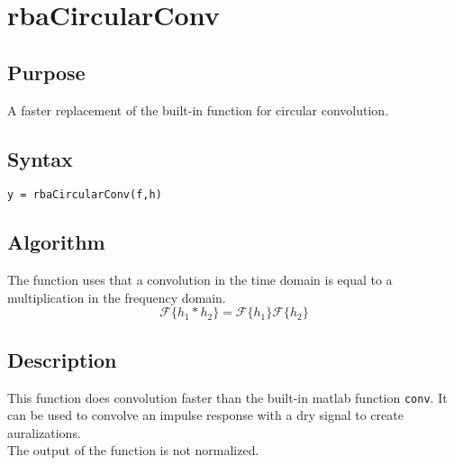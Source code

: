 
\chapter{rbaCircularConv} %
\label{cha:rbaCircularConv} %

\section{Purpose} %
\label{sec:rbaCircularConv_purpose}
A faster replacement of the built-in function for circular convolution.



\section{Syntax} %
\label{sec:rbaCircularConv_syntax}
\texttt{y = rbaCircularConv(f,h)}


\section{Algorithm} %
\label{sec:rbaCircularConv_algorithm}
The function uses that a convolution in the time domain is equal to a multiplication in the frequency domain.
\begin{equation*}
\mathcal{F}\{h_1 * h_2\} =  \mathcal{F}\{h_1\}\mathcal{F}\{h_2\}
\end{equation*}


\section{Description} %
\label{sec:rbaCircularConv_description}
This function does convolution faster than the built-in matlab function \texttt{conv}. It can be used to convolve an impulse response with a dry signal to create auralizations.\\

The output of the function is not normalized.



